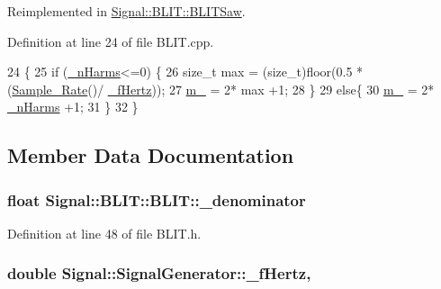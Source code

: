 Reimplemented in \hyperlink{class_signal_1_1_b_l_i_t_1_1_b_l_i_t_saw_a9c8ad70fca571cc707eaa99649d74afc}{Signal\+::\+B\+L\+I\+T\+::\+B\+L\+I\+T\+Saw}.



Definition at line 24 of file B\+L\+I\+T.\+cpp.


\begin{DoxyCode}
24                                 \{
25     \textcolor{keywordflow}{if} (\hyperlink{class_signal_1_1_b_l_i_t_1_1_b_l_i_t_a0bfbf4e7515a42fab7df748b8497f648}{\_nHarms}<=0) \{
26         \textcolor{keywordtype}{size\_t} max = (size\_t)floor(0.5 * (\hyperlink{namespace_signal_ae7b1f222afc010e0f33f306f978fcde9}{Sample\_Rate}()/ \hyperlink{class_signal_1_1_signal_generator_a85a4702347352bab1c71e0a8df8437d6}{\_fHertz}));
27         \hyperlink{class_signal_1_1_b_l_i_t_1_1_b_l_i_t_a314aae37a0a53fa3f79a4466b9558fa5}{m\_} = 2* max +1;
28     \}
29     \textcolor{keywordflow}{else}\{
30         \hyperlink{class_signal_1_1_b_l_i_t_1_1_b_l_i_t_a314aae37a0a53fa3f79a4466b9558fa5}{m\_} = 2* \hyperlink{class_signal_1_1_b_l_i_t_1_1_b_l_i_t_a0bfbf4e7515a42fab7df748b8497f648}{\_nHarms} +1;
31     \}
32 \}\end{DoxyCode}


\subsection{Member Data Documentation}
\hypertarget{class_signal_1_1_b_l_i_t_1_1_b_l_i_t_abef50d7ff7da92f5f0a8482287b47ae5}{
\subsubsection[{\+\_\+denominator}]{\setlength{\rightskip}{0pt plus 5cm}float Signal\+::\+B\+L\+I\+T\+::\+B\+L\+I\+T\+::\+\_\+denominator\hspace{0.3cm}{\ttfamily [protected]}}}\label{class_signal_1_1_b_l_i_t_1_1_b_l_i_t_abef50d7ff7da92f5f0a8482287b47ae5}


Definition at line 48 of file B\+L\+I\+T.\+h.

\hypertarget{class_signal_1_1_signal_generator_a85a4702347352bab1c71e0a8df8437d6}{
\subsubsection[{\+\_\+f\+Hertz}]{\setlength{\rightskip}{0pt plus 5cm}double Signal\+::\+Signal\+Generator\+::\+\_\+f\+Hertz\hspace{0.3cm}{\ttfamily [protected]}, {\ttfamily [inherited]}}}\label{class_signal_1_1_signal_generator_a85a4702347352bab1c71e0a8df8437d6}


